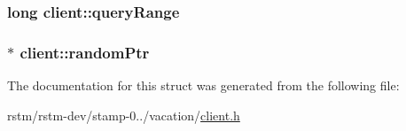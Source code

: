 \hypertarget{structclient_a1d283b8422bdc13cd4250b5189ecff91}{
\subsubsection[{query\-Range}]{\setlength{\rightskip}{0pt plus 5cm}long client\-::query\-Range}}\label{structclient_a1d283b8422bdc13cd4250b5189ecff91}
\hypertarget{structclient_ad45bd0cb54743277af6562681377c48e}{
\subsubsection[{random\-Ptr}]{$\ast$ client\-::random\-Ptr}}\label{structclient_ad45bd0cb54743277af6562681377c48e}


The documentation for this struct was generated from the following file\-:\begin{DoxyCompactItemize}
\item 
rstm/rstm-\/dev/stamp-\/0../vacation/\hyperlink{client_8h}{client.\-h}\end{DoxyCompactItemize}
